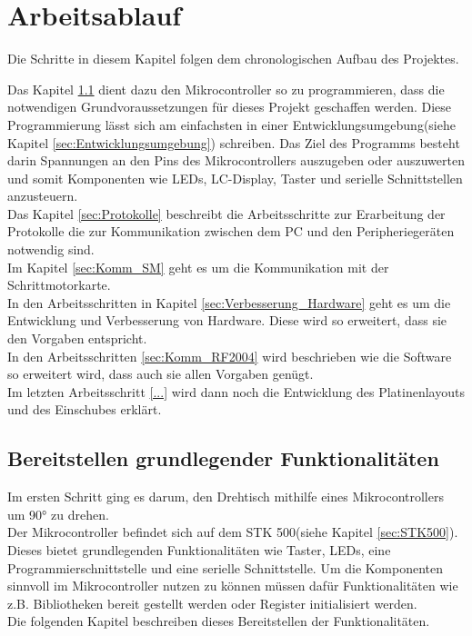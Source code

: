 
\chapter{Arbeitsablauf}
\label{cha:Arbeit}
\begin{Tipp}
Die Schritte in diesem Kapitel folgen dem chronologischen Aufbau des Projektes.
\end{Tipp}
Das Kapitel \ref{sec:Erste_Schritte} dient dazu den Mikrocontroller so zu programmieren, dass die notwendigen Grundvoraussetzungen für dieses Projekt geschaffen werden. Diese Programmierung lässt sich am einfachsten in einer Entwicklungsumgebung(siehe Kapitel \ref{sec:Entwicklungsumgebung}) schreiben. Das Ziel des Programms besteht darin Spannungen an den Pins des Mikrocontrollers auszugeben oder auszuwerten und somit Komponenten wie LEDs, LC-Display, Taster und serielle Schnittstellen anzusteuern.\\
Das Kapitel \ref{sec:Protokolle} beschreibt die Arbeitsschritte zur Erarbeitung der Protokolle die zur Kommunikation zwischen dem PC und den Peripheriegeräten notwendig sind.\\
Im Kapitel \ref{sec:Komm_SM} geht es um die Kommunikation mit der Schrittmotorkarte.\\
In den Arbeitsschritten in Kapitel \ref{sec:Verbesserung_Hardware} geht es um die Entwicklung und Verbesserung von Hardware. 
Diese wird so erweitert, dass sie den Vorgaben entspricht.\\
In den Arbeitsschritten \ref{sec:Komm_RF2004} wird beschrieben wie die Software so erweitert wird, dass auch sie allen Vorgaben genügt.\\

Im letzten Arbeitsschritt \ref{...} wird dann noch die Entwicklung des Platinenlayouts und des Einschubes erklärt.
\section{Bereitstellen grundlegender Funktionalitäten}
\label{sec:Erste_Schritte}
Im ersten Schritt ging es darum, den Drehtisch mithilfe eines Mikrocontrollers um 90° zu drehen.\\
Der Mikrocontroller befindet sich auf dem STK 500(siehe Kapitel \ref{sec:STK500}). Dieses bietet grundlegenden Funktionalitäten wie Taster, LEDs, eine Programmierschnittstelle und eine serielle Schnittstelle.
Um die Komponenten sinnvoll im Mikrocontroller nutzen zu können müssen dafür Funktionalitäten wie z.B. Bibliotheken bereit gestellt werden oder Register initialisiert werden.\\
Die folgenden Kapitel beschreiben dieses Bereitstellen der Funktionalitäten.

